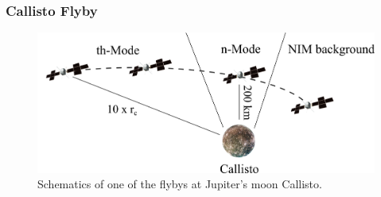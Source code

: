 		
		\subsubsection{Callisto Flyby}\label{subsubsec:Calfly}
	
		\begin{figure}[h!]
			\centering
			\includegraphics[width=.8\textwidth]{Bilder/Callisto_flyby_schematic.png}
			\caption{Schematics of one of the flybys at Jupiter's moon Callisto.}
			\label{fig:CalflybySchem}
		\end{figure}
				
